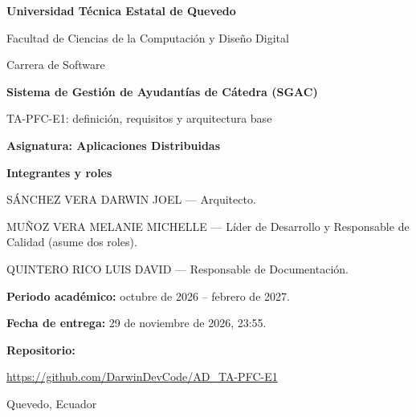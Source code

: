 \begin{titlepage}
  \thispagestyle{empty}
  \centering
  {\Large\bfseries Universidad Técnica Estatal de Quevedo\par}
  \vspace{0.3cm}
  {\large Facultad de Ciencias de la Computación y Diseño Digital\par}
  \vspace{0.2cm}
  {\large Carrera de Software\par}
  \vfill
  {\LARGE\bfseries Sistema de Gestión de Ayudantías de Cátedra (SGAC)\par}
  \vspace{0.8cm}
  {\large TA-PFC-E1: definición, requisitos y arquitectura base\par}
  \vspace{1.1cm}
  {\large\bfseries Asignatura: Aplicaciones Distribuidas\par}
  \vfill
  \begin{minipage}{0.86\textwidth}
  \raggedright
  \textbf{Integrantes y roles}\par\medskip
  SÁNCHEZ VERA DARWIN JOEL --- Arquitecto.\par\medskip
  MUÑOZ VERA MELANIE MICHELLE --- Líder de Desarrollo y Responsable de Calidad (asume dos roles).\par\medskip
  QUINTERO RICO LUIS DAVID --- Responsable de Documentación.\par\bigskip
  \textbf{Periodo académico:} octubre de 2026 -- febrero de 2027.\par\medskip
  \textbf{Fecha de entrega:} 29 de noviembre de 2026, 23:55.\par\medskip
  \textbf{Repositorio:}\par
  \url{https://github.com/DarwinDevCode/AD_TA-PFC-E1}\par
  \end{minipage}
  \vfill
  {\large Quevedo, Ecuador\par}
\end{titlepage}
